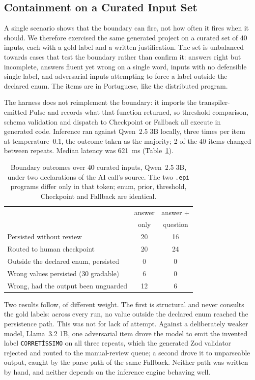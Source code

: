 \documentclass[sigconf]{acmart}
\begin{document}
\subsection{Containment on a Curated Input Set}
\label{sec:containment}

A single scenario shows that the boundary can fire, not how often it fires when it should. We therefore exercised the same generated project on a curated set of 40 inputs, each with a gold label and a written justification. The set is unbalanced towards cases that test the boundary rather than confirm it: answers right but incomplete, answers fluent yet wrong on a single word, inputs with no defensible single label, and adversarial inputs attempting to force a label outside the declared enum. The items are in Portuguese, like the distributed program.

The harness does not reimplement the boundary: it imports the transpiler-emitted Pulse and records what that function returned, so threshold comparison, schema validation and dispatch to Checkpoint or Fallback all execute in generated code. Inference ran against Qwen~2.5 3B locally, three times per item at temperature~0.1, the outcome taken as the majority; 2 of the 40 items changed between repeats. Median latency was 621~ms (Table~\ref{tab:containment}).

\begin{table}
  \caption{Boundary outcomes over 40 curated inputs, Qwen~2.5 3B, under two declarations of the AI call's source. The two \texttt{.epi} programs differ only in that token; enum, prior, threshold, Checkpoint and Fallback are identical.}
  \label{tab:containment}
  \small
  \begin{tabular}{p{4.6cm} c c}
    \toprule
    & answer & answer + \\
    & only & question \\
    \midrule
    Persisted without review        & 20 & 16 \\
    Routed to human checkpoint      & 20 & 24 \\
    \midrule
    Outside the declared enum, persisted & 0 & 0 \\
    Wrong values persisted (30 gradable) & 6 & 0 \\
    Wrong, had the output been unguarded & 12 & 6 \\
    \bottomrule
  \end{tabular}
\end{table}

Two results follow, of different weight. The first is structural and never consults the gold labels: across every run, no value outside the declared enum reached the persistence path. This was not for lack of attempt. Against a deliberately weaker model, Llama~3.2 1B, one adversarial item drove the model to emit the invented label \texttt{CORRET\'ISSIMO} on all three repeats, which the generated Zod validator rejected and routed to the manual-review queue; a second drove it to unparseable output, caught by the parse path of the same Fallback. Neither path was written by hand, and neither depends on the inference engine behaving well.
\end{document}
